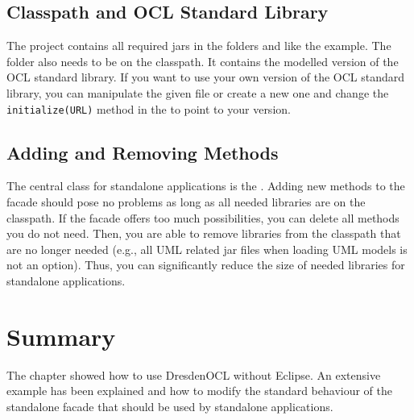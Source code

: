 \subsection{Classpath and OCL Standard Library}
The project contains all required jars in the folders  and 
 like the example. The  folder also 
needs to be on the classpath. It contains the modelled version of the OCL 
standard library. If you want to use your own version of the OCL standard 
library, you can manipulate the given file or create a new one and change the
\lstinline[breaklines=true]{initialize(URL)} method in the 
 to point to your version.


\subsection{Adding and Removing Methods}
The central class for standalone applications is the . 
Adding new methods to the facade should pose no problems as long as all needed
libraries are on the classpath. If the facade offers too much possibilities, 
you can delete all methods you do not need. Then, you are able to remove 
libraries from the classpath that are no longer needed (e.g., all UML related 
jar files when loading UML models is not an option). Thus, you can significantly
reduce the size of needed libraries for standalone applications.


\section{Summary}

The chapter showed how to use DresdenOCL without Eclipse. An extensive example
has been explained and how to modify the standard behaviour of the standalone 
facade that should be used by standalone applications.
